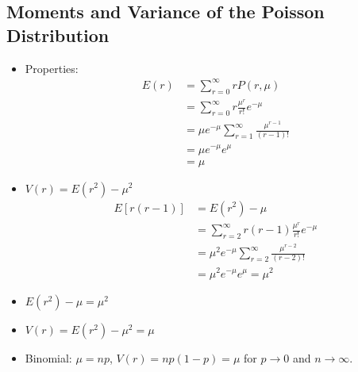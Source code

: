 \subsection{Moments and Variance of the Poisson Distribution}

\begin{itemize}
      \item Properties:
            \begin{align*}
                  E(r) & = \sum_{r=0}^{\infty} r P(r,\mu)                            \\
                       & = \sum_{r=0}^{\infty} r \frac{\mu^r}{r!} e^{-\mu}           \\
                       & = \mu e^{-\mu} \sum_{r=1}^{\infty} \frac{\mu^{r-1}}{(r-1)!} \\
                       & = \mu e^{-\mu} e^{\mu}                                      \\
                       & = \mu
            \end{align*}

      \item $V(r) = E(r^2) - \mu^2$
            \begin{align*}
                  E[r(r-1)] & = E(r^2) - \mu                                                \\
                            & = \sum_{r=2}^{\infty} r(r-1) \frac{\mu^r}{r!} e^{-\mu}        \\
                            & = \mu^2 e^{-\mu} \sum_{r=2}^{\infty} \frac{\mu^{r-2}}{(r-2)!} \\
                            & = \mu^2 e^{-\mu} e^{\mu} = \mu^2
            \end{align*}

      \item $E(r^2) - \mu = \mu^2$
      \item $V(r) = E(r^2) - \mu^2 = \mu$
      \item Binomial: $\mu = np$, $V(r) = np(1-p) = \mu$ for $p \rightarrow 0$ and $n \rightarrow \infty$.
\end{itemize}
